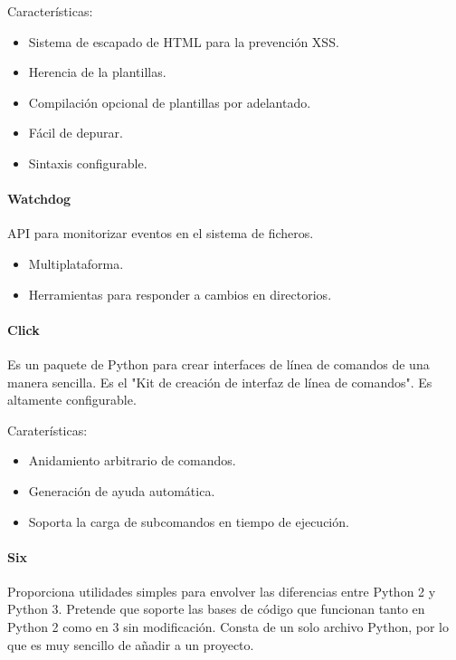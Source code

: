 Características:

\begin{itemize}
    \item Sistema de escapado de HTML para la prevención XSS.
    \item Herencia de la plantillas.
    \item Compilación opcional de plantillas por adelantado.
    \item Fácil de depurar.
    \item Sintaxis configurable.
\end{itemize}

\paragraph{Watchdog~\cite{watchdog}}

API para monitorizar eventos en el sistema de ficheros.

\begin{itemize}
    \item Multiplataforma.
    \item Herramientas para responder a cambios en directorios.
\end{itemize}

\paragraph{Click~\cite{click}}

Es un paquete de Python para crear interfaces de línea de comandos de una manera
sencilla. Es el "Kit de creación de interfaz de
línea de comandos". Es altamente configurable.

Caraterísticas:

\begin{itemize}
    \item Anidamiento arbitrario de comandos.
    \item Generación de ayuda automática.
    \item Soporta la carga de subcomandos en tiempo de ejecución.
\end{itemize}

\paragraph{Six~\cite{six}}

Proporciona utilidades simples para envolver las diferencias entre Python 2 y Python 3. Pretende
que soporte las bases de código que funcionan tanto en Python 2 como en 3 sin modificación.
Consta de un solo archivo Python, por lo que es muy sencillo de añadir a un proyecto.

